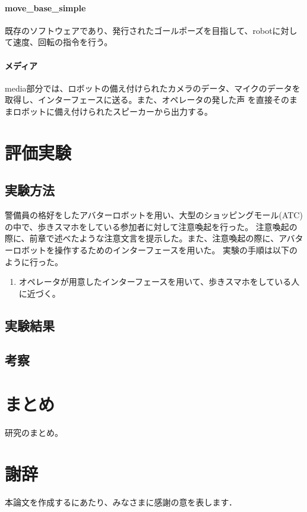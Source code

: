 \documentclass[11pt,a4j]{jreport}
\begin{document}
\subsubsection{move\_base\_simple}
既存のソフトウェアであり、発行されたゴールポーズを目指して、robotに対して速度、回転の指令を行う。

\subsubsection{メディア}
media部分では、ロボットの備え付けられたカメラのデータ、マイクのデータを取得し、インターフェースに送る。また、オペレータの発した声
を直接そのままロボットに備え付けられたスピーカーから出力する。


\chapter{評価実験}
\section{実験方法}
警備員の格好をしたアバターロボットを用い、大型のショッピングモール(ATC)の中で、歩きスマホをしている参加者に対して注意喚起を行った。
注意喚起の際に、前章で述べたような注意文言を提示した。また、注意喚起の際に、アバターロボットを操作するためのインターフェースを用いた。
実験の手順は以下のように行った。
\begin{enumerate}
  \item オペレータが用意したインターフェースを用いて、歩きスマホをしている人に近づく。
\end{enumerate}
\section{実験結果}
\section{考察}

\chapter{まとめ}
研究のまとめ。

\chapter*{謝辞} %
本論文を作成するにあたり、みなさまに感謝の意を表します．


\renewcommand{\bibname}{参考文献} %
\end{document}
